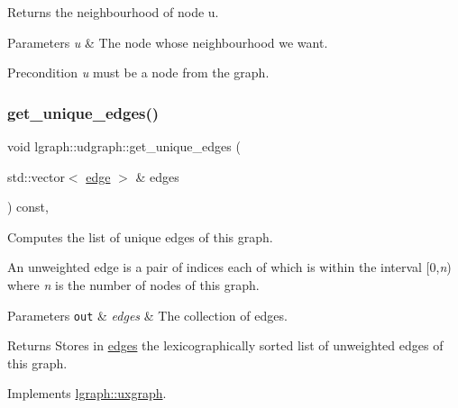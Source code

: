 Returns the neighbourhood of node u. 


\begin{DoxyParams}{Parameters}
{\em u} & The node whose neighbourhood we want. \\
\hline
\end{DoxyParams}
\begin{DoxyPrecond}{Precondition}
{\itshape u} must be a node from the graph. 
\end{DoxyPrecond}
\mbox{\label{classlgraph_1_1udgraph_a91ee7ee8d37197f9441a93f1e19a1f29}} 
\subsubsection{\texorpdfstring{get\+\_\+unique\+\_\+edges()}{get\_unique\_edges()}}
{\footnotesize\ttfamily void lgraph\+::udgraph\+::get\+\_\+unique\+\_\+edges (\begin{DoxyParamCaption}\item[{std\+::vector$<$ \hyperlink{namespacelgraph_a76bd7d50719f03de7a85db259d80d572}{edge} $>$ \&}]{edges }\end{DoxyParamCaption}) const\hspace{0.3cm}{\ttfamily [protected]}, {\ttfamily [virtual]}}



Computes the list of unique edges of this graph. 

An unweighted edge is a pair of indices each of which is within the interval \mbox{[}0,{\itshape n}) where {\itshape n} is the number of nodes of this graph.


\begin{DoxyParams}[1]{Parameters}
\mbox{\tt out}  & {\em edges} & The collection of edges. \\
\hline
\end{DoxyParams}
\begin{DoxyReturn}{Returns}
Stores in \hyperlink{classlgraph_1_1uxgraph_abf4c5ce2b595780e6ba80f06bdd0be16}{edges} the lexicographically sorted list of unweighted edges of this graph. 
\end{DoxyReturn}


Implements \hyperlink{classlgraph_1_1uxgraph_a5a014396ad3bd800028be641c140e5a0}{lgraph\+::uxgraph}.

